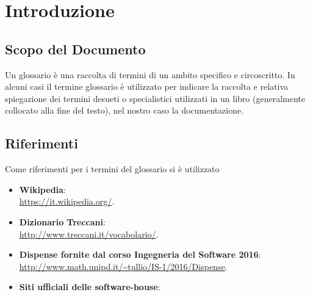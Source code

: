 \documentclass[12pt,a4paper,titlepage]{article}
\begin{document}
	
	\clearpage %


\chead{}
\cfoot{}
\rfoot{\thepage}
\renewcommand{\headrulewidth}{0.2pt}
\renewcommand{\footrulewidth}{0.2pt}

\tableofcontents
\thispagestyle{empty}

\newpage


\section{Introduzione}
\subsection{Scopo del Documento}
Un glossario è una raccolta di termini di un ambito specifico e circoscritto. In alcuni casi il termine glossario è utilizzato per indicare la raccolta e relativa spiegazione dei termini desueti o specialistici utilizzati in un libro (generalmente collocato alla fine del testo), nel nostro caso la documentazione. \\
 
\subsection{Riferimenti}
Come riferimenti per i termini del glossario si è utilizzato
\begin{itemize}
	\item \textbf{Wikipedia}: \\
	\textcolor{blue}{\url{https://it.wikipedia.org/}}.
	\item \textbf{Dizionario Treccani}: \\
	\textcolor{blue}{\url{http://www.treccani.it/vocabolario/}}.
	\item \textbf{Dispense fornite dal corso Ingegneria del Software 2016}: \\
	\textcolor{blue}{\url{http://www.math.unipd.it/~tullio/IS-1/2016/Dispense}}.
		\item \textbf{Siti ufficiali delle software-house}: \\
\end{itemize}
\end{document}
